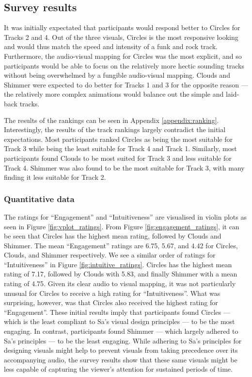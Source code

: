 \documentclass[../initial_thesis.tex]{subfiles}
\begin{document}
\subsection{Survey results}
It was initially expectated that participants would respond better to Circles for Tracks 2 and 4. Out of the three visuals, Circles is the most responsive looking and would thus match the speed and intensity of a funk and rock track. Furthermore, the audio-visual mapping for Circles was the most explicit, and so participants would be able to focus on the relatively more hectic sounding tracks without being overwhelmed by a fungible audio-visual mapping. Clouds and Shimmer were expected to do better for Tracks 1 and 3 for the opposite reason --- the relatively more complex animations would balance out the simple and laid-back tracks. \par

The results of the rankings can be seen in Appendix \ref{appendix:ranking}. Interestingly, the results of the track rankings largely contradict the initial expectations. Most participants ranked Circles as being the most suitable for Track 3 while being the least suitable for Track 4 and Track 1. Similarly, most participants found Clouds to be most suited for Track 3 and less suitable for Track 4. Shimmer was also found to be the most suitable for Track 3, with many finding it less suitable for Track 2.

\subsubsection{Quantitative data}
The ratings for ``Engagement'' and ``Intuitiveness'' are visualised in violin plots as seen in Figure \ref{fig:vplot_ratings}. From Figure \ref{fig:engagement_ratings}, it can be seen that Circles has the highest mean rating, followed by Clouds and Shimmer. The mean ``Engagement'' ratings are 6.75, 5.67, and 4.42 for Circles, Clouds, and Shimmer respectively. We see a similar order of ratings for ``Intuitiveness'' in Figure \ref{fig:intuitive_ratings}. Circles has the highest mean rating of 7.17, followed by Clouds with 5.83, and finally Shimmer with a mean rating of 4.75. Given its clear audio to visual mapping, it was not particularly unusual for Circles to receive a high rating for ``Intuitiveness''. What was surprising, however, was that Circles also received the highest rating for ``Engagement''. These initial results imply that participants found Circles --- which is the least compliant to Sa's visual design principles --- to be the most engaging. In contrast, participants found Shimmer --- which largely adhered to Sa's principles --- to be the least engaging. While adhering to Sa's principles for designing visuals might help to prevent visuals from taking precedence over its accompanying audio, the survey results show that these same visuals might be less capable of capturing the viewer's attention for sustained periods of time. \par
\end{document}

